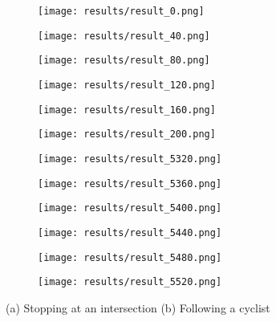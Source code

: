 \documentclass{article}
\begin{document}
\begin{figure}[H]
	\centering
	\begin{subfigure}[b]{0.15\textwidth}
		\centering
		\texttt{[image: results/result\_0.png]}
	\end{subfigure}
	\begin{subfigure}[b]{0.15\textwidth}
		\centering
		\texttt{[image: results/result\_40.png]}
	\end{subfigure}
	\begin{subfigure}[b]{0.15\textwidth}
		\centering
		\texttt{[image: results/result\_80.png]}
	\end{subfigure}
	\begin{subfigure}[b]{0.15\textwidth}
		\centering
		\texttt{[image: results/result\_120.png]}
	\end{subfigure}
	\begin{subfigure}[b]{0.15\textwidth}
		\centering
		\texttt{[image: results/result\_160.png]}
	\end{subfigure}
	\begin{subfigure}[b]{0.15\textwidth}
		\centering
		\texttt{[image: results/result\_200.png]}
	\end{subfigure}

		\begin{subfigure}[b]{0.15\textwidth}
		\centering
		\texttt{[image: results/result\_5320.png]}
	\end{subfigure}
	\begin{subfigure}[b]{0.15\textwidth}
		\centering
		\texttt{[image: results/result\_5360.png]}
	\end{subfigure}
	\begin{subfigure}[b]{0.15\textwidth}
		\centering
		\texttt{[image: results/result\_5400.png]}
	\end{subfigure}
	\begin{subfigure}[b]{0.15\textwidth}
		\centering
		\texttt{[image: results/result\_5440.png]}
	\end{subfigure}
	\begin{subfigure}[b]{0.15\textwidth}
		\centering
		\texttt{[image: results/result\_5480.png]}
	\end{subfigure}
	\begin{subfigure}[b]{0.15\textwidth}
		\centering
		\texttt{[image: results/result\_5520.png]}
	\end{subfigure}

	\caption{(a) Stopping at an intersection (b) Following a cyclist}
\end{figure}
\end{document}

